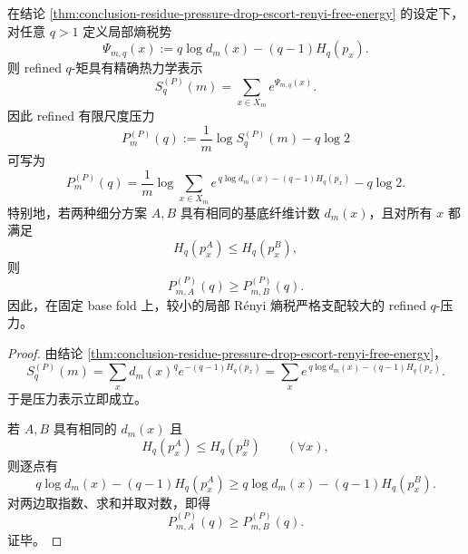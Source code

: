 \begin{theorem}[局部熵税压力表象与单调比较]\label{thm:conclusion-local-entropy-tax-pressure-representation}
在结论 \ref{thm:conclusion-residue-pressure-drop-escort-renyi-free-energy} 的设定下，对任意 \(q>1\) 定义局部熵税势
\[
\Psi_{m,q}(x):=
q\log d_m(x)-(q-1)H_q(p_x).
\]
则 refined \(q\)-矩具有精确热力学表示
\[
S_q^{(P)}(m)=\sum_{x\in X_m}e^{\Psi_{m,q}(x)}.
\]
因此 refined 有限尺度压力
\[
P_m^{(P)}(q):=\frac1m\log S_q^{(P)}(m)-q\log 2
\]
可写为
\[
P_m^{(P)}(q)
=
\frac1m\log\sum_{x\in X_m}e^{\,q\log d_m(x)-(q-1)H_q(p_x)}
-q\log 2.
\]
特别地，若两种细分方案 \(A,B\) 具有相同的基底纤维计数 \(d_m(x)\)，且对所有 \(x\) 都满足
\[
H_q(p_x^{A})\le H_q(p_x^{B}),
\]
则
\[
P_{m,A}^{(P)}(q)\ge P_{m,B}^{(P)}(q).
\]
因此，在固定 base fold 上，较小的局部 Rényi 熵税严格支配较大的 refined \(q\)-压力。
\end{theorem}
\begin{proof}
由结论 \ref{thm:conclusion-residue-pressure-drop-escort-renyi-free-energy}，
\[
S_q^{(P)}(m)
=
\sum_x d_m(x)^q e^{-(q-1)H_q(p_x)}
=
\sum_x e^{\,q\log d_m(x)-(q-1)H_q(p_x)}.
\]
于是压力表示立即成立。

若 \(A,B\) 具有相同的 \(d_m(x)\) 且
\[
H_q(p_x^{A})\le H_q(p_x^{B})
\qquad (\forall x),
\]
则逐点有
\[
q\log d_m(x)-(q-1)H_q(p_x^{A})
\ge
q\log d_m(x)-(q-1)H_q(p_x^{B}).
\]
对两边取指数、求和并取对数，即得
\[
P_{m,A}^{(P)}(q)\ge P_{m,B}^{(P)}(q).
\]
证毕。
\end{proof}
